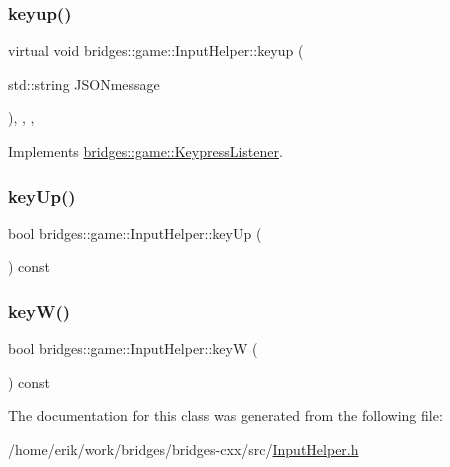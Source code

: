 \mbox{\label{classbridges_1_1game_1_1_input_helper_aa847f19c6f68ebbb63d73802abfcd9a0}} 
\subsubsection{\texorpdfstring{keyup()}{keyup()}}
{\footnotesize\ttfamily virtual void bridges\+::game\+::\+Input\+Helper\+::keyup (\begin{DoxyParamCaption}\item[{std\+::string}]{J\+S\+O\+Nmessage }\end{DoxyParamCaption})\hspace{0.3cm}{\ttfamily [inline]}, {\ttfamily [override]}, {\ttfamily [protected]}, {\ttfamily [virtual]}}



Implements \hyperlink{classbridges_1_1game_1_1_keypress_listener_a21d9f085819e30c41f3964ea2276964d}{bridges\+::game\+::\+Keypress\+Listener}.

\mbox{\label{classbridges_1_1game_1_1_input_helper_aaa62faebd9e874228b710bb2a57cba2b}} 
\subsubsection{\texorpdfstring{key\+Up()}{keyUp()}}
{\footnotesize\ttfamily bool bridges\+::game\+::\+Input\+Helper\+::key\+Up (\begin{DoxyParamCaption}{ }\end{DoxyParamCaption}) const\hspace{0.3cm}{\ttfamily [inline]}}

\mbox{\label{classbridges_1_1game_1_1_input_helper_a97a204c00019b28b4e95dde0b757a1aa}} 
\subsubsection{\texorpdfstring{key\+W()}{keyW()}}
{\footnotesize\ttfamily bool bridges\+::game\+::\+Input\+Helper\+::keyW (\begin{DoxyParamCaption}{ }\end{DoxyParamCaption}) const\hspace{0.3cm}{\ttfamily [inline]}}



The documentation for this class was generated from the following file\+:\begin{DoxyCompactItemize}
\item 
/home/erik/work/bridges/bridges-\/cxx/src/\hyperlink{_input_helper_8h}{Input\+Helper.\+h}\end{DoxyCompactItemize}
